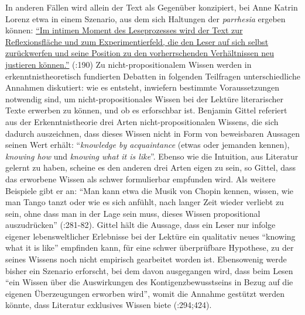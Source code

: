 \documentclass[fontsize=12pt]{scrartcl}
\begin{document}
In anderen F\"allen wird allein der Text als Gegen\"uber konzipiert, bei Anne Katrin Lorenz etwa in einem Szenario, aus dem sich Haltungen der \textit{parrhesia} ergeben k\"onnen: \href{https://publikationen.uni-tuebingen.de/xmlui/handle/10900/47049}{"`Im intimen Moment des Leseprozesses wird der Text zur Reflexionsfl\"ache und zum Experimentierfeld, die den Leser auf sich \mbox{selbst} zur\"uckwerfen und seine Position zu den vor\-herr\-schen\-den Verh\"altnissen neu justieren k\"onnen."'} (\cite{Lorenz2012}:190) Zu nicht-pro\-po\-si\-ti\-o\-na\-lem Wissen werden in erkenntnistheo\-retisch fundierten Debatten in folgenden Teilfragen unterschiedliche Annahmen diskutiert: wie es entsteht, inwiefern bestimmte Voraussetzungen notwendig sind, um nicht-pro\-po\-si\-ti\-o\-na\-les Wissen bei der Lekt\"ure li\-te\-ra\-rischer Texte erwerben zu k\"onnen, und ob es erforschbar ist. Benjamin Gittel referiert aus der Erkenntnistheorie drei Arten nicht-pro\-po\-si\-ti\-o\-na\-len Wissens, die sich dadurch aus\-zeichnen, dass dieses Wissen nicht in Form von beweisbaren Aussagen seinen Wert erh\"alt: "`\textit{know\-ledge by acquaintance} (etwas oder jemanden kennen), \textit{knowing how} und \textit{knowing what it is like}"'. Ebenso wie die Intuition, aus Li\-te\-ra\-tur gelernt zu haben, scheine es den anderen drei Arten eigen zu sein, so Gittel, dass das erworbene Wissen als schwer for\-mulierbar empfunden wird. Als weitere Beispiele gibt er an: "`Man kann etwa die Musik von Chopin kennen, wissen, wie man Tango tanzt oder wie es sich anf\"uhlt, nach langer Zeit wieder verliebt zu sein, ohne dass man in der Lage sein muss, dieses Wissen propositional auszudr\"ucken"' (\cite{Gittel2013}:281-82). Gittel h\"alt die Aussage, dass ein Leser\textsuperscript{\tiny *} nur infolge eigener lebensweltlicher Erlebnisse bei der Lekt\"ure ein qualitativ neues "`knowing what it is like"' empfinden kann, f\"ur eine schwer \"uberpr\"ufbare Hypothese, zu der seines Wissens noch nicht empirisch gearbeitet worden ist. Ebensowenig werde bis\-her ein Szenario erforscht, bei dem davon ausgegangen wird, dass beim Lesen "`ein Wissen \"uber die Auswirkungen des Kontigenzbewusstseins in Bezug auf die eigenen \"Uberzeugungen erworben wird"', womit die Annahme gest\"utzt werden k\"onnte, dass Li\-te\-ra\-tur exklusives Wissen biete (\cite{Gittel2013}:294;424).
\end{document}
